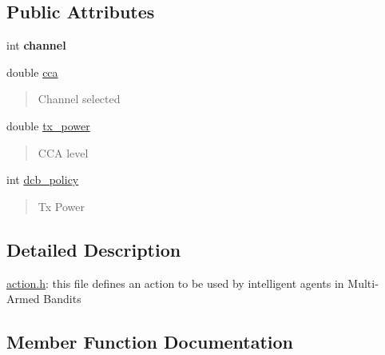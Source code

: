 \subsection*{Public Attributes}
\begin{DoxyCompactItemize}
\item 
\mbox{\label{structAction_a10bd77f2df34cc5e972ad739d6de33a5}} 
int {\bfseries channel}
\item 
\mbox{\label{structAction_a4b49ac00f6da0e1c5575f46979d46a6d}} 
double \hyperlink{structAction_a4b49ac00f6da0e1c5575f46979d46a6d}{cca}
\begin{DoxyCompactList}\small\item\em \begin{quote}
Channel selected \end{quote}
\end{DoxyCompactList}\item 
\mbox{\label{structAction_ac4318a3cb6f0da91dd74d0a3bc4d9bc7}} 
double \hyperlink{structAction_ac4318a3cb6f0da91dd74d0a3bc4d9bc7}{tx\+\_\+power}
\begin{DoxyCompactList}\small\item\em \begin{quote}
C\+CA level \end{quote}
\end{DoxyCompactList}\item 
\mbox{\label{structAction_aebb2c5819cb96ef0abda63039348e618}} 
int \hyperlink{structAction_aebb2c5819cb96ef0abda63039348e618}{dcb\+\_\+policy}
\begin{DoxyCompactList}\small\item\em \begin{quote}
Tx Power \end{quote}
\end{DoxyCompactList}\end{DoxyCompactItemize}


\subsection{Detailed Description}
\hyperlink{action_8h_source}{action.\+h}\+: this file defines an action to be used by intelligent agents in Multi-\/\+Armed Bandits 

\subsection{Member Function Documentation}
\mbox{\label{structAction_a64ec8f147b8c40f9de1094f8a6f94eb5}} 
